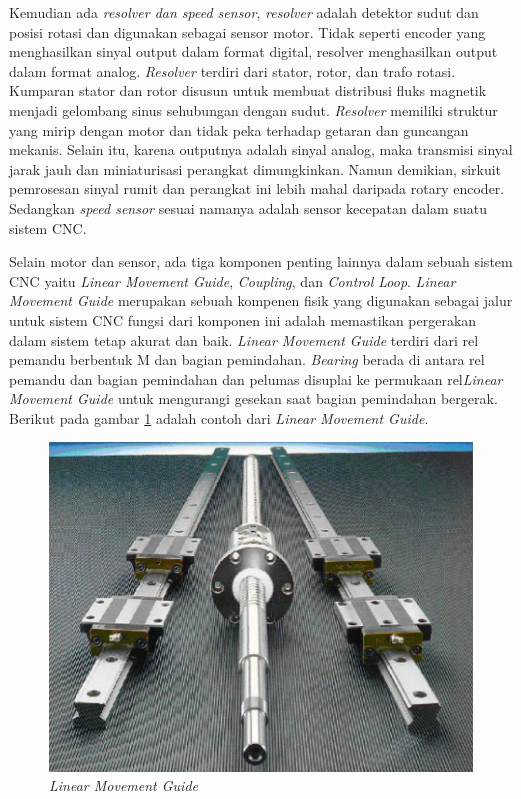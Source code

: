 Kemudian ada \textit{resolver dan speed sensor}, \textit{resolver} adalah detektor sudut dan posisi rotasi dan digunakan sebagai sensor motor. Tidak seperti encoder yang menghasilkan sinyal output dalam format digital, resolver menghasilkan output dalam format analog. \textit{Resolver} terdiri dari stator, rotor, dan trafo rotasi. Kumparan stator dan rotor disusun untuk membuat distribusi fluks magnetik menjadi gelombang sinus sehubungan dengan sudut. \textit{Resolver} memiliki struktur yang mirip dengan motor dan tidak peka terhadap getaran dan guncangan mekanis. Selain itu, karena outputnya adalah sinyal analog, maka transmisi sinyal jarak jauh dan miniaturisasi perangkat dimungkinkan. Namun demikian, sirkuit pemrosesan sinyal rumit dan perangkat ini lebih mahal daripada rotary encoder. Sedangkan \textit{speed sensor} sesuai namanya adalah sensor kecepatan dalam suatu sistem CNC.

Selain motor dan sensor, ada tiga komponen penting lainnya dalam sebuah sistem CNC yaitu \textit{Linear Movement Guide}, \textit{Coupling}, dan \textit{Control Loop}. \textit{Linear Movement Guide} merupakan sebuah kompenen fisik yang digunakan sebagai jalur untuk sistem CNC fungsi dari komponen ini adalah memastikan pergerakan dalam sistem tetap akurat dan baik. \textit{Linear Movement Guide} terdiri dari rel pemandu berbentuk M dan bagian pemindahan. \textit{Bearing} berada di antara rel pemandu dan bagian pemindahan dan pelumas disuplai ke permukaan rel\textit{Linear Movement Guide} untuk mengurangi gesekan saat bagian pemindahan bergerak. Berikut pada gambar \ref{fig:lmg} adalah contoh dari \textit{Linear Movement Guide}.

\begin{figure}[H]
    \centering
    \includegraphics[width=0.6\linewidth]{gambar/lm-gudie.png}
    \caption{\textit{Linear Movement Guide}}
    \label{fig:lmg}
\end{figure}

